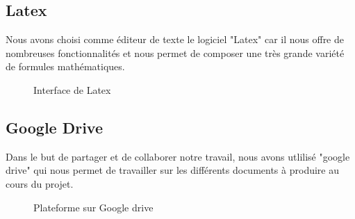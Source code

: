 	\subsection{Latex}
	Nous avons choisi comme éditeur de texte le logiciel "Latex" car il nous  offre de nombreuses fonctionnalités et nous permet de composer une très grande variété de formules mathématiques.
	\begin{figure}[H]
		\begin{center}
			\centering
		\end{center}
		\caption{Interface de Latex}
	\end{figure}
	\subsection{Google Drive}
	Dans le but de partager et de collaborer notre travail, nous avons utlilisé "google drive" qui nous permet de travailler sur les différents documents à produire au cours du projet.
	\begin{figure}[H]
		\begin{center}
			\centering
		\end{center}
		\caption{Plateforme sur Google drive}
	\end{figure}
